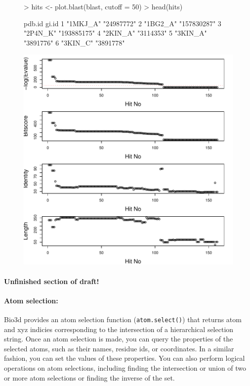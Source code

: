 \documentclass[a4paper]{article}
\begin{document}
\begin{figure}[hbtp]
\begin{center}
\begin{Schunk}
\begin{Sinput}
> hits <- plot.blast(blast, cutoff = 50)
> head(hits)
\end{Sinput}
\begin{Soutput}
  pdb.id   gi.id      
1 "1MKJ_A" "24987772" 
2 "1BG2_A" "157830287"
3 "2P4N_K" "193885175"
4 "2KIN_A" "3114353"  
5 "3KIN_A" "3891776"  
6 "3KIN_C" "3891778"  
\end{Soutput}
\end{Schunk}
\includegraphics{figs/fig-blasthits}
\label{fig:blast}
\end{center}
\end{figure}

\paragraph{Unfinished section of draft!}

\paragraph{Atom selection:} 
Bio3d provides an atom selection function (\texttt{atom.select()}) that returns atom and xyz indicies corresponding to the intersection of a hierarchical selection string.  Once an atom selection is made, you can query the properties of the selected atoms, such as their names, residue ids, or coordinates. In a similar fashion, you can set the values of these properties. You can also perform logical operations on atom selections, including finding the intersection or union of two or more atom selections or finding the inverse of the set.
\end{document}
